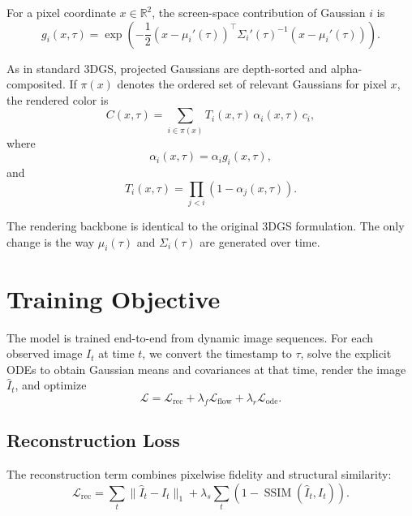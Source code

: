 \documentclass[11pt]{article}
\begin{document}
For a pixel coordinate $x\in\mathbb{R}^2$, the screen-space contribution of Gaussian $i$ is
\begin{equation}
g_i(x,\tau)
=
\exp
\left(
-\frac{1}{2}
(x-\mu_i'(\tau))^\top
\Sigma_i'(\tau)^{-1}
(x-\mu_i'(\tau))
\right).
\end{equation}

As in standard 3DGS, projected Gaussians are depth-sorted and alpha-composited. If $\pi(x)$ denotes the ordered set of relevant Gaussians for pixel $x$, the rendered color is
\begin{equation}
C(x,\tau)
=
\sum_{i\in\pi(x)}
T_i(x,\tau)\,
\alpha_i(x,\tau)\,
c_i,
\end{equation}
where
\begin{equation}
\alpha_i(x,\tau)
=
\alpha_i g_i(x,\tau),
\end{equation}
and
\begin{equation}
T_i(x,\tau)
=
\prod_{j<i}
\left(
1-\alpha_j(x,\tau)
\right).
\end{equation}

The rendering backbone is identical to the original 3DGS formulation. The only change is the way $\mu_i(\tau)$ and $\Sigma_i(\tau)$ are generated over time.

\section{Training Objective}

The model is trained end-to-end from dynamic image sequences. For each observed image $I_t$ at time $t$, we convert the timestamp to $\tau$, solve the explicit ODEs to obtain Gaussian means and covariances at that time, render the image $\hat I_t$, and optimize
\begin{equation}
\mathcal{L}
=
\mathcal{L}_{\text{rec}}
+
\lambda_f \mathcal{L}_{\text{flow}}
+
\lambda_r \mathcal{L}_{\text{ode}}.
\end{equation}

\subsection{Reconstruction Loss}

The reconstruction term combines pixelwise fidelity and structural similarity:
\begin{equation}
\mathcal{L}_{\text{rec}}
=
\sum_t
\|\hat I_t-I_t\|_1
+
\lambda_s
\sum_t
\left(
1-\operatorname{SSIM}(\hat I_t,I_t)
\right).
\end{equation}
\end{document}
